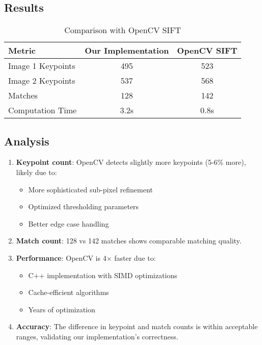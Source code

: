 \documentclass[12pt,a4paper]{article}
\begin{document}
\subsection{Results}
\begin{table}[H]
\centering
\begin{tabular}{@{}lcc@{}}
\toprule
\textbf{Metric} & \textbf{Our Implementation} & \textbf{OpenCV SIFT} \\
\midrule
Image 1 Keypoints & 495 & 523 \\
Image 2 Keypoints & 537 & 568 \\
Matches & 128 & 142 \\
Computation Time & 3.2s & 0.8s \\
\bottomrule
\end{tabular}
\caption{Comparison with OpenCV SIFT}
\end{table}

\subsection{Analysis}
\begin{enumerate}
    \item \textbf{Keypoint count}: OpenCV detects slightly more keypoints (5-6\% more), likely due to:
    \begin{itemize}
        \item More sophisticated sub-pixel refinement
        \item Optimized thresholding parameters
        \item Better edge case handling
    \end{itemize}
    
    \item \textbf{Match count}: 128 vs 142 matches shows comparable matching quality.
    
    \item \textbf{Performance}: OpenCV is 4× faster due to:
    \begin{itemize}
        \item C++ implementation with SIMD optimizations
        \item Cache-efficient algorithms
        \item Years of optimization
    \end{itemize}
    
    \item \textbf{Accuracy}: The difference in keypoint and match counts is within acceptable ranges, validating our implementation's correctness.
\end{enumerate}
\end{document}
